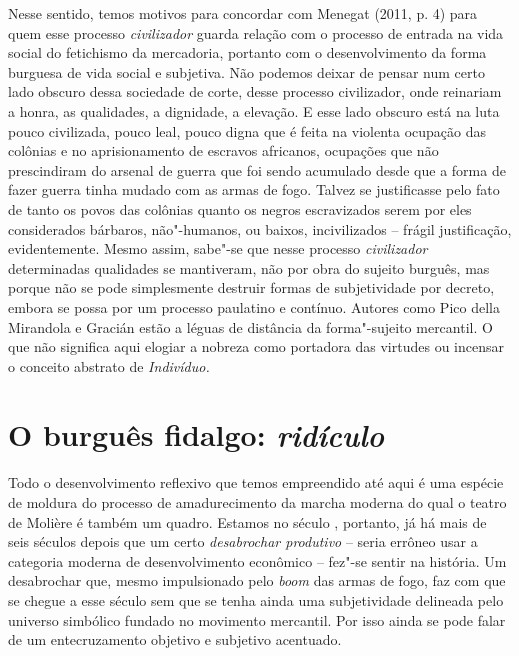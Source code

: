 Nesse sentido, temos motivos para concordar com Menegat (2011, p. 4)
para quem esse processo \emph{civilizador} guarda relação com o processo
de entrada na vida social do fetichismo da mercadoria, portanto com o
desenvolvimento da forma burguesa de vida social e subjetiva. Não
podemos deixar de pensar num certo lado obscuro dessa sociedade de
corte, desse processo civilizador, onde reinariam a honra, as
qualidades, a dignidade, a elevação. E esse lado obscuro está na luta
pouco civilizada, pouco leal, pouco digna que é feita na violenta
ocupação das colônias e no aprisionamento de escravos africanos,
ocupações que não prescindiram do arsenal de guerra que foi sendo
acumulado desde que a forma de fazer guerra tinha mudado com as armas de
fogo. Talvez se justificasse pelo fato de tanto os povos das colônias
quanto os negros escravizados serem por eles considerados bárbaros,
não"-humanos, ou baixos, incivilizados -- frágil justificação,
evidentemente. Mesmo assim, sabe"-se que nesse processo
\emph{civilizador} determinadas qualidades se mantiveram, não por obra
do sujeito burguês, mas porque não se pode simplesmente destruir formas
de subjetividade por decreto, embora se possa por um processo paulatino
e contínuo. Autores como Pico della Mirandola e Gracián estão a léguas
de distância da forma"-sujeito mercantil. O que não significa aqui
elogiar a nobreza como portadora das virtudes ou incensar o conceito
abstrato de \emph{Indivíduo.}

\section{O burguês fidalgo: \emph{ridículo}}

Todo o desenvolvimento reflexivo que temos empreendido até aqui é uma
espécie de moldura do processo de amadurecimento da marcha moderna do
qual o teatro de Molière é também um quadro. Estamos no século ,
portanto, já há mais de seis séculos depois que um certo
\emph{desabrochar produtivo} -- seria errôneo usar a categoria moderna
de desenvolvimento econômico -- fez"-se sentir na história. Um
desabrochar que, mesmo impulsionado pelo \emph{boom} das armas de fogo,
faz com que se chegue a esse século sem que se tenha ainda uma
subjetividade delineada pelo universo simbólico fundado no movimento
mercantil. Por isso ainda se pode falar de um entecruzamento objetivo e
subjetivo acentuado.


